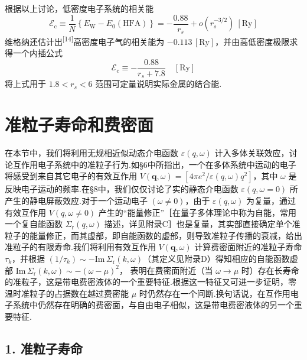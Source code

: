 根据以上讨论，低密度电子系统的相关能
\begin{equation}
  \mathcal{E}_{\mathrm{c}}\equiv\frac{1}{N}
  \left\{E_{\mathrm{W}}-E_{0}(\mathrm{HFA})\right\}
  =-\frac{0.88}{r_{s}}+o\left(r_{s}^{-3/2}\right)\ \left[\mathrm{Ry}\right]
\end{equation}
维格纳还估计出\textsuperscript{[14]}高密度电子气的相关能为 $-0.113\,[\mathrm{Ry}]$，并由高低密度极限求得一个内插公式
\begin{equation}
  \mathcal{E}_{\mathrm{c}}\equiv-\frac{0.88}{r_{s}+7.8}\quad\left[\mathrm{Ry}\right]
\end{equation}
将上式用于 $1.8<r_{s}<6$ 范围可定量说明实际金属的结合能.

\section{准粒子寿命和费密面}

在本节中，我们将利用无规相近似动态介电函数 $\varepsilon(q,\omega)$ 计入多体关联效应，讨论互作用电子系统中的准粒子行为.如§6中所指出，一个在多体系统中运动的电子将感受到来自其它电子的有效互作用
$V(\boldsymbol{q},\omega)=\left[4\pi e^{2}/\varepsilon(q,\omega)q^{2}\right]$，其中 $\omega$ 是反映电子运动的频率.在§8中，我们仅仅讨论了实的静态介电函数 $\varepsilon(q,\omega=0)$ 所产生的静电屏蔽效应.对于一个运动电子 $(\omega\neq 0)$，由于 $\varepsilon(q,\omega)$ 为复量，通过有效互作用 $V(q,\omega\neq 0)$ 产生的“能量修正”［在量子多体理论中称为自能，常用一个复自能函数 $\varSigma_{\mathrm{r}}(q,\omega)$ 描述，详见附录C］也是复量，其实部直接确定单个准粒子的能量修正，而其虚部，即自能函数的虚部，则导致准粒子传播的衰减，给出准粒子的有限寿命.我们将利用有效互作用 $V(\boldsymbol{q},\omega)$ 计算费密面附近的准粒子寿命 $\tau_{k}$，并根据 $\left(1/\tau_{k}\right)\sim-\mathrm{Im}\,\varSigma_{\mathrm{r}}(k,\omega)$（其定义见附录D）得知相应的自能函数虚部
$\mathrm{Im}\,\varSigma_{\mathrm{r}}(k,\omega)\sim-(\omega-\mu)^{2}$，
表明在费密面附近（当 $\omega\to\mu$ 时）存在长寿命的准粒子，这是带电费密液体的一个重要特征.根据这一特征又可进一步证明，零温时准粒子的占据数在越过费密能 $\mu$ 时仍然存在一个间断.换句话说，在互作用电子系统中仍然存在明确的费密面，与自由电子相似，这是带电费密液体的另一个重要特征.

\subsection*{1. 准粒子寿命}

